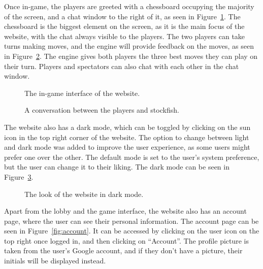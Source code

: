 Once in-game, the players are greeted with a chessboard occupying the majority of the screen, and a chat window to the
right of it, as seen in Figure~\ref{fig:game}.
The chessboard is the biggest element on the screen, as it is the main focus of the website, with the chat always
visible to the players.
The two players can take turns making moves, and the engine will provide feedback on the moves, as seen in
Figure~\ref{fig:game-chat}.
The engine gives both players the three best moves they can play on their turn.
Players and spectators can also chat with each other in the chat window.

\begin{figure}[H]
    \centering
    \setlength{\fboxsep}{0pt}
    \caption{The in-game interface of the website.}\label{fig:game}
\end{figure}

\begin{figure}[H]
    \centering
    \setlength{\fboxsep}{0pt}
    \caption{A conversation between the players and stockfish.}\label{fig:game-chat}
\end{figure}

The website also has a dark mode, which can be toggled by clicking on the sun icon in the top right corner of the
website.
The option to change between light and dark mode was added to improve the user experience, as some users might prefer
one over the other.
The default mode is set to the user's system preference, but the user can change it to their liking.
The dark mode can be seen in Figure~\ref{fig:game-dark}.

\begin{figure}[H]
    \centering
    \setlength{\fboxsep}{0pt}
    \caption{The look of the website in dark mode.}\label{fig:game-dark}
\end{figure}

Apart from the lobby and the game interface, the website also has an account page, where the user can see their
personal information.
The account page can be seen in Figure~\ref{fig:account}.
It can be accessed by clicking on the user icon on the top right once logged in, and then clicking on ``Account''.
The profile picture is taken from the user's Google account, and if they don't have a picture, their initials will be
displayed instead.


